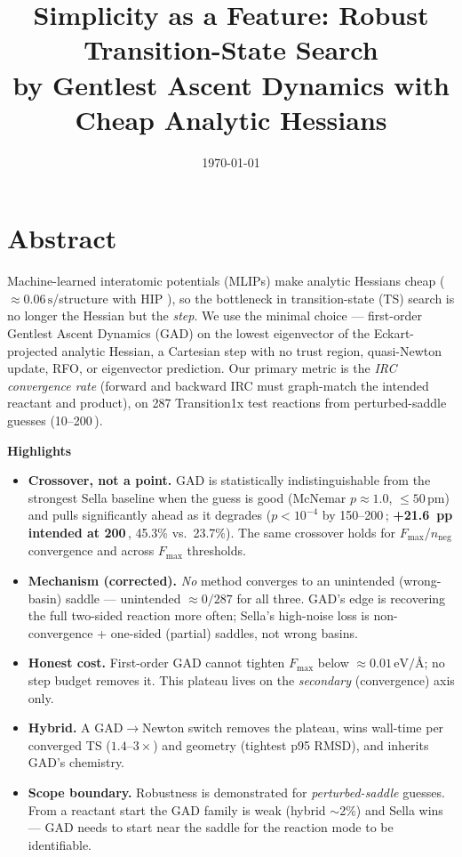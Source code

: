 \documentclass[11pt]{article}
\title{\Large\textbf{Simplicity as a Feature: Robust Transition-State Search\\[2pt]
by Gentlest Ascent Dynamics with Cheap Analytic Hessians}}
\author{}
\date{\today}
\newcommand{\SI}[2]{#1\,\text{#2}}
\newcommand{\fmax}{\ensuremath{F_{\mathrm{max}}}}
\newcommand{\nneg}{\ensuremath{n_{\mathrm{neg}}}}
\newcommand{\evA}{\ensuremath{\,\text{eV/\AA}}}
\begin{document}
\maketitle
\thispagestyle{empty}
\vspace{-2.2em}

\section*{Abstract}
\noindent
Machine-learned interatomic potentials (MLIPs) make analytic Hessians cheap
($\approx\!\SI{0.06}{s}$/structure with HIP \cite{hip}), so the bottleneck in
transition-state (TS) search is no longer the Hessian but the \emph{step}. We
use the minimal choice --- first-order Gentlest Ascent Dynamics (GAD) on the
lowest eigenvector of the Eckart-projected analytic Hessian, a Cartesian step
with no trust region, quasi-Newton update, RFO, or eigenvector prediction. Our
primary metric is the \emph{IRC convergence rate} (forward and
backward IRC must graph-match the intended reactant and product), on 287
Transition1x test reactions from perturbed-saddle guesses (10--\SI{200}{pm}).

\vspace{0.3em}
\noindent\textbf{Highlights}
\begin{itemize}
\item \textbf{Crossover, not a point.} GAD is statistically indistinguishable
  from the strongest Sella baseline when the guess is good (McNemar $p\!\approx\!1.0$,
  $\le\!\SI{50}{pm}$) and pulls significantly ahead as it degrades
  ($p\!<\!10^{-4}$ by 150--\SI{200}{pm}; \textbf{+21.6~pp intended at \SI{200}{pm}},
  45.3\% vs.\ 23.7\%). The same crossover holds for \fmax/\nneg convergence and across
  \fmax{} thresholds.
\item \textbf{Mechanism (corrected).} \emph{No} method converges to an
  unintended (wrong-basin) saddle --- unintended $\approx 0/287$ for all three.
  GAD's edge is recovering the full two-sided reaction more often; Sella's
  high-noise loss is non-convergence + one-sided (partial) saddles, not wrong
  basins.
\item \textbf{Honest cost.} First-order GAD cannot tighten \fmax{} below
  $\approx\!0.01\evA$; no step budget removes it. This plateau lives on the
  \emph{secondary} (convergence) axis only.
\item \textbf{Hybrid.} A GAD$\rightarrow$Newton switch removes the plateau, wins
  wall-time per converged TS ($1.4$--$3\times$) and geometry (tightest p95
  RMSD), and inherits GAD's chemistry.
\item \textbf{Scope boundary.} Robustness is demonstrated for \emph{perturbed-saddle}
  guesses. From a reactant start the GAD family is weak (hybrid $\sim$2\%) and
  Sella wins --- GAD needs to start near the saddle for the reaction mode to be
  identifiable.
\end{itemize}
\end{document}
